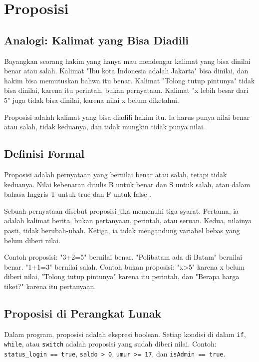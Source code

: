 \documentclass[11pt,a4paper]{article}
\begin{document}
\section{Proposisi}

\subsection{Analogi: Kalimat yang Bisa Diadili}

Bayangkan seorang hakim yang hanya mau mendengar kalimat yang bisa dinilai benar atau salah. Kalimat "Ibu kota Indonesia adalah Jakarta" bisa dinilai, dan hakim bisa memutuskan bahwa itu benar. Kalimat "Tolong tutup pintunya" tidak bisa dinilai, karena itu perintah, bukan pernyataan. Kalimat "x lebih besar dari 5" juga tidak bisa dinilai, karena nilai x belum diketahui.

Proposisi adalah kalimat yang bisa diadili hakim itu. Ia harus punya nilai benar atau salah, tidak keduanya, dan tidak mungkin tidak punya nilai.

\subsection{Definisi Formal}

Proposisi adalah pernyataan yang bernilai benar atau salah, tetapi tidak keduanya. Nilai kebenaran ditulis B untuk benar dan S untuk salah, atau dalam bahasa Inggris T untuk true dan F untuk false \cite{rosen}.

Sebuah pernyataan disebut proposisi jika memenuhi tiga syarat. Pertama, ia adalah kalimat berita, bukan pertanyaan, perintah, atau seruan. Kedua, nilainya pasti, tidak berubah-ubah. Ketiga, ia tidak mengandung variabel bebas yang belum diberi nilai.

Contoh proposisi: "3+2=5" bernilai benar. "Polibatam ada di Batam" bernilai benar. "1+1=3" bernilai salah. Contoh bukan proposisi: "x>5" karena x belum diberi nilai, "Tolong tutup pintunya" karena itu perintah, dan "Berapa harga tiket?" karena itu pertanyaan.

\subsection{Proposisi di Perangkat Lunak}

Dalam program, proposisi adalah ekspresi boolean. Setiap kondisi di dalam \texttt{if}, \texttt{while}, atau \texttt{switch} adalah proposisi yang sudah diberi nilai. Contoh: \texttt{status\_login == true}, \texttt{saldo > 0}, \texttt{umur >= 17}, dan \texttt{isAdmin == true}.
\end{document}
